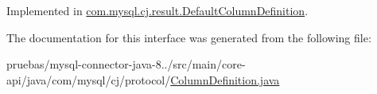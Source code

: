 Implemented in \mbox{\hyperlink{classcom_1_1mysql_1_1cj_1_1result_1_1_default_column_definition_ae2045059ad696f24e150f350d78bf78f}{com.\+mysql.\+cj.\+result.\+Default\+Column\+Definition}}.



The documentation for this interface was generated from the following file\+:\begin{DoxyCompactItemize}
\item 
pruebas/mysql-\/connector-\/java-\/8../src/main/core-\/api/java/com/mysql/cj/protocol/\mbox{\hyperlink{core-api_2java_2com_2mysql_2cj_2protocol_2_column_definition_8java}{Column\+Definition.\+java}}\end{DoxyCompactItemize}
